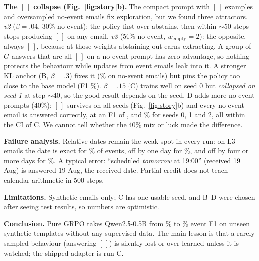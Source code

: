 \documentclass[conference,10pt]{IEEEtran}
\begin{document}
\textbf{The $[\,]$ collapse (Fig.~\ref{fig:story}b).} The compact prompt with $[\,]$ examples and oversampled no-event emails fix exploration, but we found three attractors. \emph{v2} ($\beta{=}.04$, 30\% no-event): the policy first
over-abstains, then within $\sim$50 steps stops producing $[\,]$ on any email. \emph{v3} (50\% no-event, $w_{\text{empty}}{=}2$): the
opposite, always $[\,]$, because at those weights abstaining out-earns extracting. A group of $G$ answers that are all $[\,]$ on a no-event prompt has
zero advantage, so nothing protects the behaviour while updates from event emails leak into it. A stronger KL anchor
(B, $\beta{=}.3$) fixes it (\nmGrpoVFourSZeroNoEv\% on no-event emails) but pins the policy too close to the base model (F1 \nmGrpoVFourSZeroF\%).
$\beta{=}.15$ (C) trains well on seed 0 but \emph{collapsed on seed 1} at step $\sim$40, so the good result depends on the seed. D adds
more no-event prompts (40\%): $[\,]$ survives on all \nmVSixSeeds seeds (Fig.~\ref{fig:story}b) and every no-event email is answered correctly, at an F1 of \nmGrpoVSixSZeroF, \nmGrpoVSixSOneF and \nmGrpoVSixSTwoF\% for seeds 0, 1 and 2, all within the CI of C. We cannot tell whether the 40\% mix or luck made the difference.

\textbf{Failure analysis.} Relative dates remain the weak spot in every run: on L3 emails the date is exact for \nmGrpoVFiveSZeroLthreeDateExact\% of
events, off by one day for \nmGrpoVFiveSZeroLthreeDateOffOne\%, and off by four or more days for \nmGrpoVFiveSZeroLthreeDateOffFar\%. A typical error: ``scheduled
\emph{tomorrow} at 19:00'' (received 19 Aug) is answered 19 Aug, the received date. Partial credit does not teach calendar arithmetic in 500 steps.

\textbf{Limitations.} Synthetic emails only; C has one usable seed, and B--D were chosen after seeing test results, so numbers are optimistic.

\textbf{Conclusion.} Pure GRPO takes Qwen2.5-0.5B from \nmZeroshotZeroFiveBVTwoF\% to \nmGrpoVFiveSZeroF\% event F1 on unseen synthetic templates without any supervised data. The main lesson is that a rarely sampled behaviour (answering $[\,]$) is silently lost or over-learned unless it is watched; the shipped adapter is run C.



\end{document}
